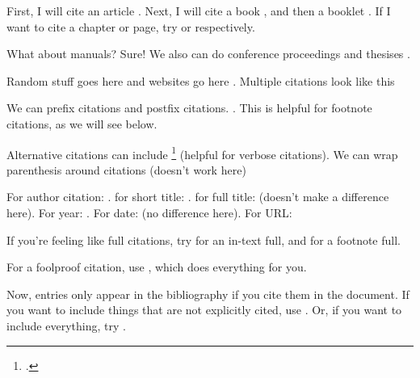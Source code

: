 \documentclass[12pt]{report}
\begin{document}
\tableofcontents
\pagebreak 
\begin{refsection}

First, I will cite an article \cite{article}. Next, I will cite a book \cite{book}, and then a booklet \cite{booklet}. If I want to cite a chapter or page, try \cite{inbook} or \cite{inbookpages} respectively. 

What about manuals? Sure! \cite{manual} We also can do conference proceedings \cite{proceedings} and thesises \cite{thesis}. 

Random stuff goes here \cite{misc} and websites go here \cite{online}. Multiple citations look like this \cite{misc, online}

We can prefix citations and postfix citations. \cite[prefix][postfix]{manual}. This is helpful for footnote citations, as we will see below. 

Alternative citations can include \footcite{online} (helpful for verbose citations). We can wrap parenthesis around citations \parencite{online} (doesn't work here)

For author citation: \cite{online}. for short title: . for full title:  (doesn't make a difference here). For year: \citeyear{book}. For date:  (no difference here). For URL: 

If you're feeling like full citations, try  for an in-text full, and  for a footnote full. 

For a foolproof citation, use \autocite{online}, which does everything for you. 

Now, entries only appear in the bibliography if you cite them in the document. If you want to include things that are not explicitly cited, use \nocite{online}. Or, if you want to include everything, try \nocite{*}. 

\printbibliography[title = custom title for bibliography, heading=bibintoc]

\end{refsection}
\end{document}
